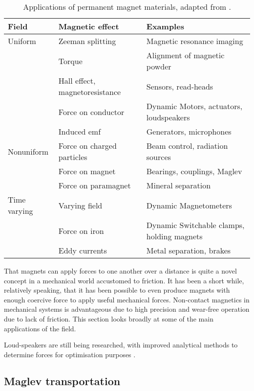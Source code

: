 \begin{table}
\begin{wide}
\begin{tabular}{@{}lll@{}}
\toprule
Field & Magnetic effect & Examples \\
\midrule
Uniform & Zeeman splitting & Magnetic resonance imaging \\
& Torque & Alignment of magnetic powder \\
& Hall effect, magnetoresistance & Sensors, read-heads \\
& Force on conductor & Dynamic Motors, actuators, loudspeakers \\
& Induced emf & Generators, microphones \\
Nonuniform & Force on charged particles & Beam control, 
radiation sources %
\\
& Force on magnet & Bearings, couplings, Maglev \\
& Force on paramagnet & Mineral separation \\
Time varying & Varying field & Dynamic Magnetometers \\
& Force on iron & Dynamic Switchable clamps, holding magnets \\
& Eddy currents & Metal separation, brakes \\
\bottomrule
\end{tabular}
\end{wide}
\caption{Applications of permanent magnet materials, 
adapted from \textcite{coey2002}.}
\end{table}

That magnets can apply forces to one another over a distance is quite a novel concept in a mechanical world accustomed to friction.
It has been a short while, relatively speaking, that it has been possible to even produce magnets with enough coercive force to apply useful mechanical forces.
Non-contact magnetics in mechanical systems is advantageous due to high precision and wear-free operation due to lack of friction.
This section looks broadly at some of the main applications of the field.

Loud-speakers are still being researched, with improved analytical methods to determine forces for optimisation purposes \cite{merit2009}.

\subsection{Maglev transportation}

